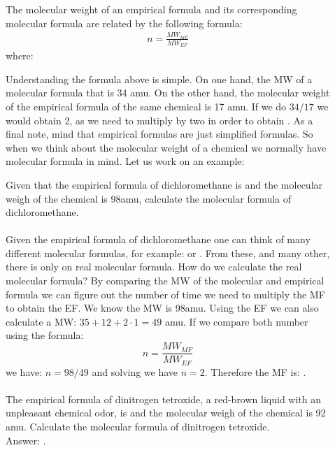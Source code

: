 \documentclass[main.tex]{subfiles}
\begin{document}
\sloppy
\begin{description}
\item[] 
The molecular weight of an empirical formula and its corresponding molecular formula are related by the following formula:
\begin{equation*}\begin{split}
\boxed{  n =\frac{ MW_{MF}}{MW_{EF}} } 
\end{split}\end{equation*}
where:

Understanding the formula above is simple. On one hand, the MW of a molecular formula  that is 34 amu. On the other hand, the molecular weight of the empirical formula of the same chemical  is 17 amu. If we do $34/17$ we would obtain 2, as we need to multiply  by two in order to obtain . As a final note, mind that empirical formulas are just simplified formulas. So when we think about the molecular weight of a chemical we normally have molecular formula in mind. Let us work on an example:
\begin{example} %
Given that the empirical formula of dichloromethane is  and the molecular weigh of the chemical is 98amu, calculate the molecular formula of dichloromethane.\\
\\
Given the empirical formula of dichloromethane one can think of many different molecular formulas, for example:  or . From these, and many other, there is only on real molecular formula. How do we calculate the real molecular formula? By comparing the MW of the molecular and empirical formula we can figure out the number of time we need to multiply the MF to obtain the EF. We know the MW is 98amu. Using the EF we can also calculate a MW: $35+12+2\cdot 1=49$ amu. If we compare both number using the formula:
\[ n =\frac{ MW_{MF}}{MW_{EF}}\]
we have: $n=98/49$ and  solving we have $n=2$. Therefore the MF is: .
\\
\faDiamond\ \\
The empirical formula of dinitrogen tetroxide, a red-brown liquid with an unpleasant chemical odor, is  and the molecular weigh of the chemical is 92 amu. Calculate the molecular formula of dinitrogen tetroxide.\\
\flushright Answer: .
\end{example}%
\end{description}
\end{document}
